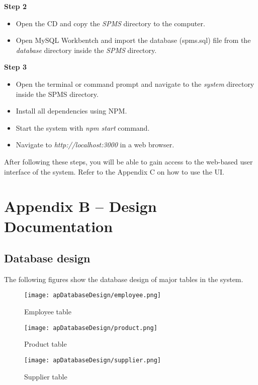 \documentclass[12pt]{report}
\begin{document}
\noindent
{\large{\bf{Step 2}}}
\begin{itemize}
	\item Open the CD and copy the {\it{SPMS}} directory to the computer.
	\item Open MySQL Workbentch and import the database (spms.sql) file from the {\it{database}} directory inside the {\it{SPMS}} directory.
\end{itemize}

\noindent
{\large{\bf{Step 3}}}
\begin{itemize}
	\item Open the terminal or command prompt and navigate to the {\it{system}} directory inside the SPMS directory.
	\item Install all dependencies using NPM.
	\item Start the system with {\it{npm start}} command.
	\item Navigate to {\it{http://localhost:3000}} in a web browser.
\end{itemize}

After following these steps, you will be able to gain access to the web-based user interface of the system. Refer to the Appendix C on how to use the UI.

\setcounter{chapter}{2}
\setcounter{section}{0}
\setcounter{figure}{0}
\chapter*{\Huge Appendix B – Design Documentation}

\section{Database design}
The following figures show the database design of major tables in the system.

\begin{figure}[H]
	\centering
	\texttt{[image: apDatabaseDesign/employee.png]}
	\caption{Employee table}
\end{figure}

\begin{figure}[H]
	\centering
	\texttt{[image: apDatabaseDesign/product.png]}
	\caption{Product table}
\end{figure}

\begin{figure}[H]
	\centering
	\texttt{[image: apDatabaseDesign/supplier.png]}
	\caption{Supplier table}
\end{figure}
\end{document}

